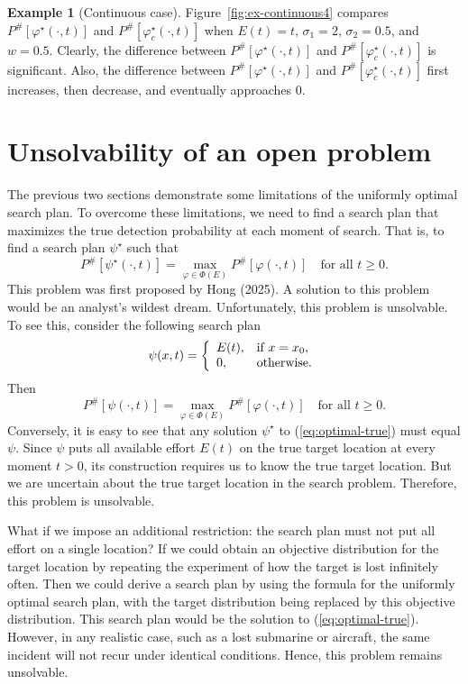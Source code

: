 \documentclass[12pt]{article}
\theoremstyle{plain}
\theoremstyle{definition}
\newtheorem{example}{Example}%
\theoremstyle{remark}
\begin{document}
\begin{example}[Continuous case]
Figure~\ref{fig:ex-continuous4} compares $P^{\#}[\varphi^\star(\cdot, t)]$ and  $P^{\#}[\varphi^\star_c(\cdot, t)]$ when  $E(t)=t$, $\sigma_1=2$, $\sigma_2=0.5$, and $w=0.5$.   Clearly, the difference between $P^{\#}[\varphi^\star(\cdot, t)]$ and $P^{\#}[\varphi^\star_c(\cdot, t)]$ is significant. Also, the difference between $P^{\#}[\varphi^\star(\cdot, t)]$ and $P^{\#}[\varphi^\star_c(\cdot, t)]$  first increases, then decrease, and eventually approaches $0$.

\end{example}



%
\section{Unsolvability of an open problem}
The previous two sections demonstrate some limitations of the uniformly optimal search plan.  To overcome these limitations,  we need to find a search plan that maximizes the true detection probability at each moment of search. That is, to find a search plan $\psi^\star$ such that
\begin{equation}
\label{eq:optimal-true}
P^{\#}[\psi^\star(\cdot, t)]=\max_{\varphi\in \Phi(E)}P^{\#}[\varphi(\cdot, t)] \quad \text{for all $t\geq 0$.}
\end{equation}
This problem was first proposed by Hong (2025).  A solution to this problem would be an analyst's wildest dream. Unfortunately,  this problem is unsolvable.  To see this,  consider the following search plan 
\[
\psi(x, t)=\left\{
		                           \begin{array}{ll}
		                           E(t),& \hbox{if $x=x_0$,} \\
					0,  & \hbox{otherwise.} 
		                          \end{array}
		                         \right.
\]
Then
\[
P^{\#}[\psi(\cdot, t)]=\max_{\varphi\in \Phi(E)}P^{\#}[\varphi(\cdot, t)] \quad \text{for all $t\geq 0$.}
\]
Conversely, it is easy to see that any solution $\psi^\star$ to (\ref{eq:optimal-true}) must equal $\psi$.  Since $\psi$ puts all available effort $E(t)$ on the true target location at every moment $t>0$,  its construction requires us to know the true target location.  But we are uncertain about the true target location in the search problem.  Therefore,  this problem is unsolvable. 

What if we impose an additional restriction: the search plan must not put all effort on a single location? If we could obtain an objective distribution for the target location by repeating the experiment of how the target is lost infinitely often.  Then we could derive a search plan by using the formula for the uniformly optimal search plan, with the target distribution being replaced by this objective distribution. This search plan would be the solution to  (\ref{eq:optimal-true}).  However,  in any realistic case, such as a lost submarine or aircraft,  the same incident will not recur under identical conditions.  Hence,  this problem remains unsolvable.
\end{document}
